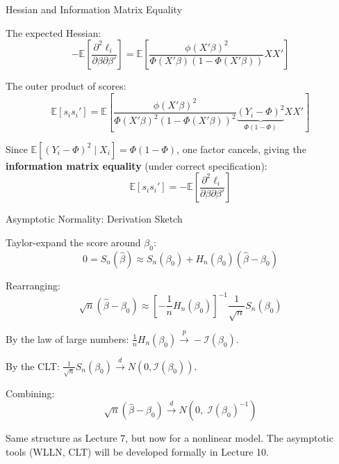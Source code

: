 \documentclass[aspectratio=169]{beamer}
\numberwithin{equation}{section}
\begin{document}

\begin{frame}{Hessian and Information Matrix Equality}

The expected Hessian:
\[
-\mathbb{E}\!\left[\frac{\partial^2 \ell_i}{\partial \beta \partial \beta'}\right]
=
\mathbb{E}\!\left[\frac{\phi(X'\beta)^2}{\Phi(X'\beta)(1-\Phi(X'\beta))} X X'\right]
\]

\pause

The outer product of scores:
\[
\mathbb{E}[s_i s_i']
=
\mathbb{E}\!\left[\frac{\phi(X'\beta)^2}{\Phi(X'\beta)^2(1-\Phi(X'\beta))^2} \underbrace{(Y_i - \Phi)^2}_{\Phi(1-\Phi)} X X'\right]
\]

\pause

Since $\mathbb{E}[(Y_i - \Phi)^2 \mid X_i] = \Phi(1-\Phi)$, one factor cancels, giving the \textbf{information matrix equality} (under correct specification):
\[
\boxed{\mathbb{E}[s_i s_i'] = -\mathbb{E}\!\left[\frac{\partial^2 \ell_i}{\partial \beta \partial \beta'}\right]}
\]

\end{frame}


\begin{frame}{Asymptotic Normality: Derivation Sketch}

Taylor-expand the score around $\beta_0$:
\[
0 = S_n(\hat\beta) \approx S_n(\beta_0) + H_n(\beta_0)(\hat\beta - \beta_0)
\]

\pause

Rearranging:
\[
\sqrt{n}(\hat\beta - \beta_0) \approx \left[-\frac{1}{n}H_n(\beta_0)\right]^{-1} \frac{1}{\sqrt{n}} S_n(\beta_0)
\]

\pause

By the law of large numbers: $\frac{1}{n}H_n(\beta_0) \overset{p}{\to} -\mathcal{I}(\beta_0)$.

\pause

By the CLT: $\frac{1}{\sqrt{n}} S_n(\beta_0) \overset{d}{\to} N(0, \mathcal{I}(\beta_0))$.

\pause

Combining:
\[
\boxed{\sqrt{n}(\hat\beta - \beta_0) \overset{d}{\to} N\!\left(0,\; \mathcal{I}(\beta_0)^{-1}\right)}
\]

\pause

Same structure as Lecture 7, but now for a nonlinear model. The asymptotic tools (WLLN, CLT) will be developed formally in Lecture 10.

\end{frame}
\end{document}
